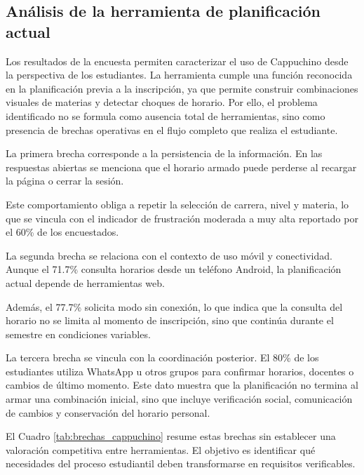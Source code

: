 \subsection{Análisis de la herramienta de planificación actual}

Los resultados de la encuesta permiten caracterizar el uso de Cappuchino desde la perspectiva de los estudiantes. La herramienta cumple una función reconocida en la planificación previa a la inscripción, ya que permite construir combinaciones visuales de materias y detectar choques de horario. Por ello, el problema identificado no se formula como ausencia total de herramientas, sino como presencia de brechas operativas en el flujo completo que realiza el estudiante.

La primera brecha corresponde a la persistencia de la información. En las respuestas abiertas se menciona que el horario armado puede perderse al recargar la página o cerrar la sesión.

Este comportamiento obliga a repetir la selección de carrera, nivel y materia, lo que se vincula con el indicador de frustración moderada a muy alta reportado por el 60\% de los encuestados.

La segunda brecha se relaciona con el contexto de uso móvil y conectividad. Aunque el 71.7\% consulta horarios desde un teléfono Android, la planificación actual depende de herramientas web.

Además, el 77.7\% solicita modo sin conexión, lo que indica que la consulta del horario no se limita al momento de inscripción, sino que continúa durante el semestre en condiciones variables.

La tercera brecha se vincula con la coordinación posterior. El 80\% de los estudiantes utiliza WhatsApp u otros grupos para confirmar horarios, docentes o cambios de último momento. Este dato muestra que la planificación no termina al armar una combinación inicial, sino que incluye verificación social, comunicación de cambios y conservación del horario personal.

El Cuadro \ref{tab:brechas_cappuchino} resume estas brechas sin establecer una valoración competitiva entre herramientas. El objetivo es identificar qué necesidades del proceso estudiantil deben transformarse en requisitos verificables.

